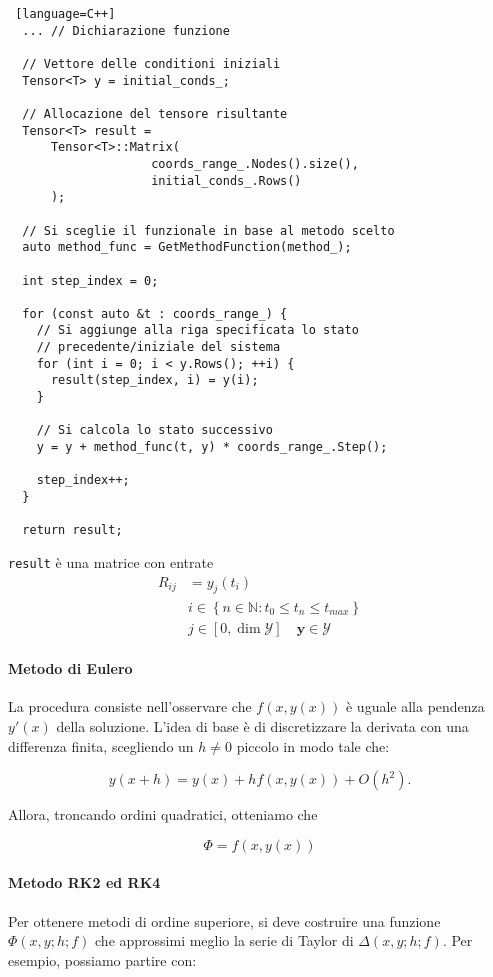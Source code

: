 \begin{lstlisting} [language=C++] 
  ... // Dichiarazione funzione 

  // Vettore delle conditioni iniziali
  Tensor<T> y = initial_conds_;

  // Allocazione del tensore risultante
  Tensor<T> result =
      Tensor<T>::Matrix(
                    coords_range_.Nodes().size(),
                    initial_conds_.Rows()
      );

  // Si sceglie il funzionale in base al metodo scelto
  auto method_func = GetMethodFunction(method_);

  int step_index = 0;

  for (const auto &t : coords_range_) {
    // Si aggiunge alla riga specificata lo stato
    // precedente/iniziale del sistema
    for (int i = 0; i < y.Rows(); ++i) {
      result(step_index, i) = y(i);
    }

    // Si calcola lo stato successivo 
    y = y + method_func(t, y) * coords_range_.Step();

    step_index++;
  }

  return result;
\end{lstlisting}

\texttt{result} è una matrice con entrate
\begin{align*}
	R_{ij} & = y_j(t_i)                                                        \\
	       & i \in \left\{n \in \mathbb{N} : t_0 \leq t_n \leq t_{max}\right\} \\
	       & j \in [0, \dim{\mathcal{Y}}] \quad \mathbf{y} \in \mathcal{Y}
\end{align*}


\paragraph{Metodo di Eulero}
La procedura consiste nell'osservare che \(f(x, y(x))\) è uguale alla pendenza
\(y'(x)\) della soluzione. L'idea di base è di discretizzare la derivata con una
differenza finita, scegliendo un \(h \neq 0\) piccolo in modo tale che:

\[
	y(x + h) = y(x) + h f(x, y(x)) + O(h^2).
\]

Allora, troncando ordini quadratici, otteniamo che

\[
	\Phi = f(x, y(x))
\]

\paragraph{Metodo RK2 ed RK4}
Per ottenere metodi di ordine superiore, si deve costruire una funzione \(\Phi(x, y; h; f)\) che approssimi meglio la serie di Taylor di \(\Delta(x, y; h; f)\). Per esempio, possiamo partire con:

